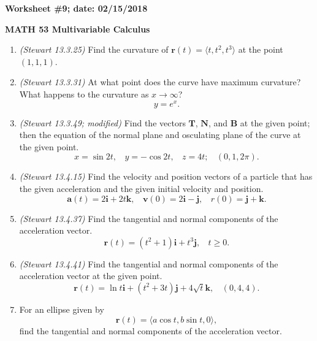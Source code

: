 \documentclass{article}
\newcommand{\ii}{\mathbf{i}}
\newcommand{\jj}{\mathbf{j}}
\newcommand{\kk}{\mathbf{k}}
\newcommand{\rr}{\mathbf{r}}
\newcommand{\vv}{\mathbf{v}}
\newcommand{\aaa}{\mathbf{a}}
\newcommand{\TT}{\mathbf{T}}
\newcommand{\NN}{\mathbf{N}}
\newcommand{\BB}{\mathbf{B}}
\begin{document}
{\bf Worksheet \#9; date: 02/15/2018}

{\bf MATH 53 Multivariable Calculus}

\begin{enumerate}
\item {\em (Stewart 13.3.25)} Find the curvature of $\rr(t) = \langle t, t^2, t^3 \rangle$ at the point $(1, 1, 1)$.

\item {\em (Stewart 13.3.31)} At what point does the curve have maximum curvature? What happens to the curvature as $x \to \infty$?
\[
y = e^x.
\]

\item {\em (Stewart 13.3.49; modified)} Find the vectors $\TT$, $\NN$, and $\BB$ at the given point; then the equation of the normal plane and osculating plane of the curve at the given point.
\[
x = \sin 2t, ~~~~ y = -\cos 2t, ~~~~ z = 4t; ~~~~ (0, 1, 2\pi).
\]

\item {\em (Stewart 13.4.15)} Find the velocity and position vectors of a particle that has the given acceleration and the given initial velocity and position.
\[
\aaa(t) = 2 \ii + 2t \kk, ~~~~ \vv(0) = 2\ii - \jj, ~~~~ r(0) = \jj + \kk.
\]

\item {\em (Stewart 13.4.37)} Find the tangential and normal components of the acceleration vector.
\[
\rr(t) = (t^2 + 1) \ii + t^3 \jj, ~~~~ t \ge 0.
\]

\item {\em (Stewart 13.4.41)} Find the tangential and normal components of the acceleration vector at the given point.
\[
\rr(t) = \ln t \ii + (t^2 + 3t) \jj + 4 \sqrt{t} \kk, ~~~~ (0, 4, 4).
\]

\item For an ellipse given by
\[
\rr(t) = \langle a \cos t, b \sin t, 0\rangle,
\]
find the tangential and normal components of the acceleration vector.
\end{enumerate}
\end{document}
